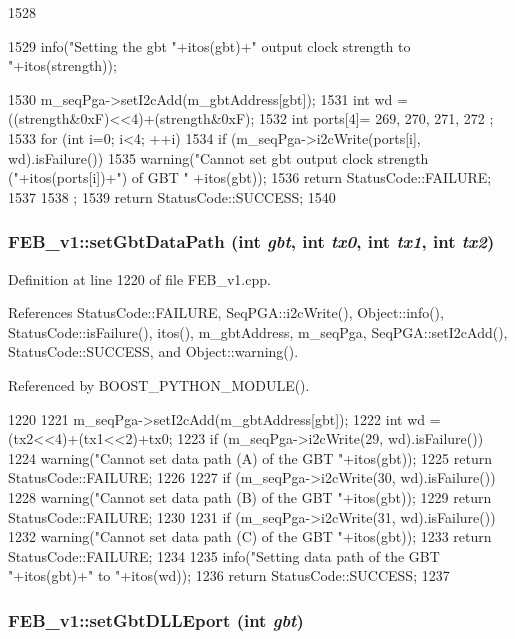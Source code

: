 \begin{DoxyCode}
1528                                                            {
1529   info("Setting the gbt "+itos(gbt)+" output clock strength to "+itos(strength));
      
1530   m_seqPga->setI2cAdd(m_gbtAddress[gbt]);
1531   int wd = ((strength&0xF)<<4)+(strength&0xF);
1532   int ports[4]={ 269, 270, 271, 272 };
1533   for (int i=0; i<4; ++i){
1534     if (m_seqPga->i2cWrite(ports[i], wd).isFailure()){
1535       warning("Cannot set gbt output clock strength ("+itos(ports[i])+") of GBT "
      +itos(gbt));
1536       return StatusCode::FAILURE;
1537     }
1538   };
1539   return StatusCode::SUCCESS;
1540 }
\end{DoxyCode}
\hypertarget{classFEB__v1_aabd651b11d1119ce3a19b7fb083cca78}{
\subsubsection[{setGbtDataPath}]{ FEB\_\-v1::setGbtDataPath (int {\em gbt}, \/  int {\em tx0}, \/  int {\em tx1}, \/  int {\em tx2})}}
\label{classFEB__v1_aabd651b11d1119ce3a19b7fb083cca78}


Definition at line 1220 of file FEB\_\-v1.cpp.

References StatusCode::FAILURE, SeqPGA::i2cWrite(), Object::info(), StatusCode::isFailure(), itos(), m\_\-gbtAddress, m\_\-seqPga, SeqPGA::setI2cAdd(), StatusCode::SUCCESS, and Object::warning().

Referenced by BOOST\_\-PYTHON\_\-MODULE().


\begin{DoxyCode}
1220                                                                    {
1221   m_seqPga->setI2cAdd(m_gbtAddress[gbt]);
1222   int wd = (tx2<<4)+(tx1<<2)+tx0; 
1223   if (m_seqPga->i2cWrite(29, wd).isFailure()){
1224     warning("Cannot set data path (A) of the GBT "+itos(gbt));
1225     return StatusCode::FAILURE;
1226   }
1227   if (m_seqPga->i2cWrite(30, wd).isFailure()){
1228     warning("Cannot set data path (B) of the GBT "+itos(gbt));
1229     return StatusCode::FAILURE;
1230   }
1231   if (m_seqPga->i2cWrite(31, wd).isFailure()){
1232     warning("Cannot set data path (C) of the GBT "+itos(gbt));
1233     return StatusCode::FAILURE;
1234   }
1235   info("Setting data path of the GBT "+itos(gbt)+" to "+itos(wd));
1236   return StatusCode::SUCCESS;
1237 }
\end{DoxyCode}
\hypertarget{classFEB__v1_a66584fe850cdf9e4ccd03fd4b2f4db38}{
\subsubsection[{setGbtDLLEport}]{ FEB\_\-v1::setGbtDLLEport (int {\em gbt})}}
\label{classFEB__v1_a66584fe850cdf9e4ccd03fd4b2f4db38}


